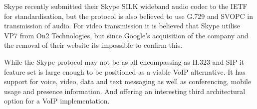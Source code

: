 Skype recently submitted their Skype SILK wideband audio codec to the IETF for standardisation\cite{website:IETFSILK10}, but the protocol is also believed to use G.729 and SVOPC in transmission of audio. For video transmission it is believed that Skype utilise VP7 from On2 Technologies, but since Google’s acquisition of the company and the removal of their website its impossible to confirm this.

While the Skype protocol may not be as all encompassing as H.323 and SIP it feature set is large enough to be positioned as a viable VoIP alternative. It has support for voice, video, data and text messaging as well as conferencing, mobile usage and presence information. And offering an interesting third architectural option for a VoIP implementation.

